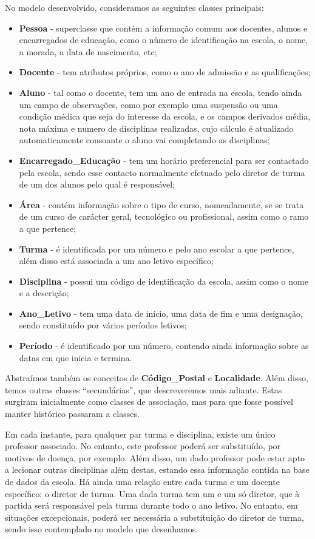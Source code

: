 \documentclass[12pt,a4paper,reqno]{report}
\numberwithin{figure}{section}
\numberwithin{equation}{section}
\begin{document}
No modelo desenvolvido, consideramos as seguintes classes principais:
\begin{itemize}
\item \textbf{Pessoa} - superclasse que contém a informação comum aos docentes, alunos e encarregados de educação, como o número de identificação na escola, o nome, a morada, a data de nascimento, etc;
\item \textbf{Docente} - tem atributos próprios, como o ano de admissão e as qualificações;
\item \textbf{Aluno} - tal como o docente, tem um ano de entrada na escola, tendo ainda um campo de observações, como por exemplo uma suspensão ou uma condição médica que seja do interesse da escola, e os campos derivados média, nota máxima e numero de disciplinas realizadas, cujo cálculo é atualizado automaticamente consoante o aluno vai completando as disciplinas;
\item \textbf{Encarregado\_Educação} - tem um horário preferencial para ser contactado pela escola, sendo esse contacto normalmente efetuado pelo diretor de turma de um dos alunos pelo qual é responsável;
\item \textbf{Área} - contém informação sobre o tipo de curso, nomeadamente, se se trata de um curso de carácter geral, tecnológico ou profissional, assim como o ramo a que pertence;
\item \textbf{Turma} - é identificada por um número e pelo ano escolar a que pertence, além disso está associada a um ano letivo específico;
\item \textbf{Disciplina} - possui um código de identificação da escola, assim como o nome e a descrição;
\item \textbf{Ano\_Letivo} - tem uma data de início, uma data de fim e uma designação, sendo constituído por vários períodos letivos;
\item \textbf{Período} - é identificado por um número, contendo ainda informação sobre as datas em que inicia e termina.
\end{itemize}

Abstraímos também os conceitos de \textbf{Código\_Postal} e \textbf{Localidade}. Além disso, temos outras classes ``secundárias'', que descreveremos mais adiante. Estas surgiram inicialmente como classes de associação, mas para que fosse possível manter histórico passaram a classes.

Em cada instante, para qualquer par turma e disciplina, existe um único professor associado. No entanto, este professor poderá ser substituído, por motivos de doença, por exemplo. Além disso, um dado professor pode estar apto a lecionar outras disciplinas além destas, estando essa informação contida na base de dados da escola. Há ainda uma relação entre cada turma e um docente específico: o diretor de turma. Uma dada turma tem um e um só diretor, que à partida será responsável pela turma durante todo o ano letivo. No entanto, em situações excepcionais, poderá ser necessária a substituição do diretor de turma, sendo isso contemplado no modelo que desenhamos.
\end{document}
